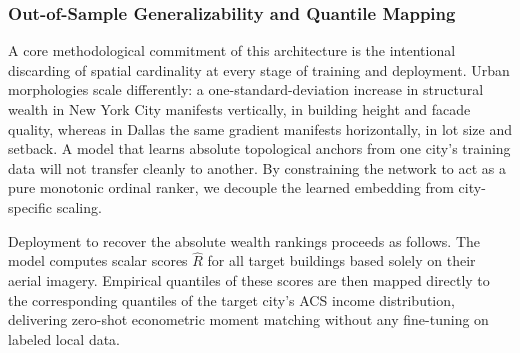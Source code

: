 \documentclass[conference]{IEEEtran}
\begin{document}


\subsubsection{\textbf{Out-of-Sample Generalizability and Quantile Mapping}}

A core methodological commitment of this architecture is the intentional discarding of spatial cardinality at every stage of training and deployment. Urban morphologies scale differently: a one-standard-deviation increase in structural wealth in New York City manifests vertically, in building height and facade quality, whereas in Dallas the same gradient manifests horizontally, in lot size and setback. A model that learns absolute topological anchors from one city's training data will not transfer cleanly to another. By constraining the network to act as a pure monotonic ordinal ranker, we decouple the learned embedding from city-specific scaling.

Deployment to recover the absolute wealth rankings proceeds as follows. The model computes scalar scores $\hat{R}$ for all target buildings based solely on their aerial imagery. Empirical quantiles of these scores are then mapped directly to the corresponding quantiles of the target city's ACS income distribution, delivering zero-shot econometric moment matching without any fine-tuning on labeled local data.


\end{document}
